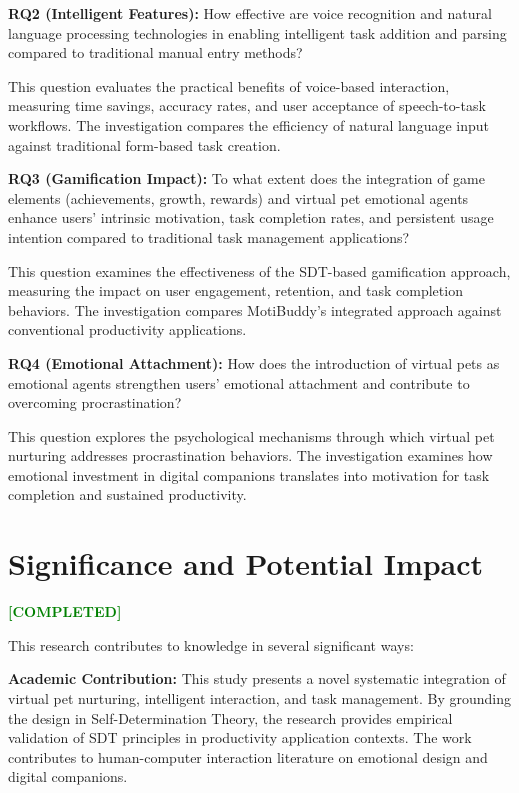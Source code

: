 \documentclass[12pt,a4paper]{report}
\newcommand{\completed}{\textcolor{green}{\textbf{[COMPLETED]}}}
\begin{document}
\textbf{RQ2 (Intelligent Features):} How effective are voice recognition and natural language processing technologies in enabling intelligent task addition and parsing compared to traditional manual entry methods?

This question evaluates the practical benefits of voice-based interaction, measuring time savings, accuracy rates, and user acceptance of speech-to-task workflows. The investigation compares the efficiency of natural language input against traditional form-based task creation.

\textbf{RQ3 (Gamification Impact):} To what extent does the integration of game elements (achievements, growth, rewards) and virtual pet emotional agents enhance users' intrinsic motivation, task completion rates, and persistent usage intention compared to traditional task management applications?

This question examines the effectiveness of the SDT-based gamification approach, measuring the impact on user engagement, retention, and task completion behaviors. The investigation compares MotiBuddy's integrated approach against conventional productivity applications.

\textbf{RQ4 (Emotional Attachment):} How does the introduction of virtual pets as emotional agents strengthen users' emotional attachment and contribute to overcoming procrastination?

This question explores the psychological mechanisms through which virtual pet nurturing addresses procrastination behaviors. The investigation examines how emotional investment in digital companions translates into motivation for task completion and sustained productivity.

\section{Significance and Potential Impact}
\label{sec:significance}

\completed

This research contributes to knowledge in several significant ways:

\textbf{Academic Contribution:} This study presents a novel systematic integration of virtual pet nurturing, intelligent interaction, and task management. By grounding the design in Self-Determination Theory, the research provides empirical validation of SDT principles in productivity application contexts. The work contributes to human-computer interaction literature on emotional design and digital companions.
\end{document}

